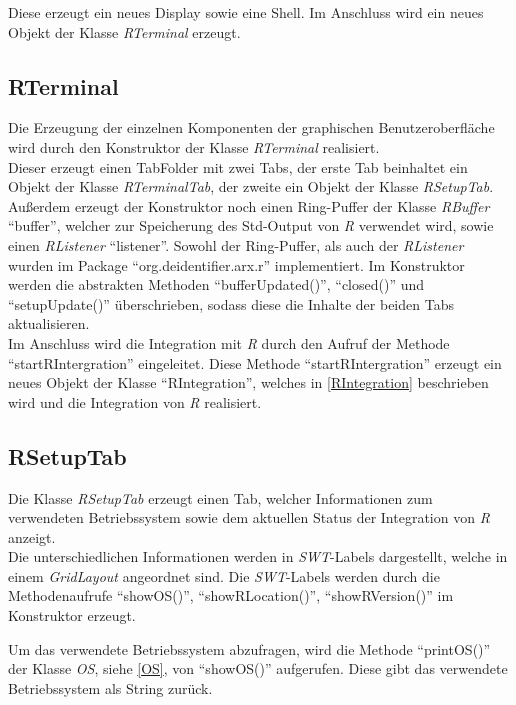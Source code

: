 \documentclass[a4paper, 12pt]{report} %
\begin{document}
Diese erzeugt ein neues Display sowie eine Shell. Im Anschluss wird ein neues Objekt der Klasse \textit{RTerminal} erzeugt.

\subsection{RTerminal}

Die Erzeugung der einzelnen Komponenten der graphischen Benutzeroberfläche wird durch den Konstruktor der Klasse \textit{RTerminal} realisiert.\\

Dieser erzeugt einen TabFolder mit zwei Tabs, der erste Tab beinhaltet ein Objekt der Klasse \textit{RTerminalTab}, der zweite ein Objekt der Klasse \textit{RSetupTab}.
Außerdem erzeugt der Konstruktor noch einen Ring-Puffer der Klasse \textit{RBuffer} "`buffer"', welcher zur Speicherung des Std-Output von \textit{R} verwendet wird, sowie einen \textit{RListener} "`listener"'. Sowohl der Ring-Puffer, als auch der \textit{RListener} wurden im Package "`org.deidentifier.arx.r"' implementiert.
Im Konstruktor werden die abstrakten Methoden "`bufferUpdated()"', "`closed()"' und "`setupUpdate()"' überschrieben, sodass diese die Inhalte der beiden Tabs aktualisieren.\\

Im Anschluss wird die Integration mit \textit{R} durch den Aufruf der Methode "`startRIntergration"' eingeleitet.
Diese Methode "`startRIntergration"' erzeugt ein neues Objekt der Klasse "`RIntegration"', welches in \ref{RIntegration} beschrieben wird und die Integration von \textit{R} realisiert.


\subsection{RSetupTab}

Die Klasse \textit{RSetupTab} erzeugt einen Tab, welcher Informationen zum verwendeten Betriebssystem sowie dem aktuellen Status der Integration von \textit{R} anzeigt.\\

Die unterschiedlichen Informationen werden in \textit{SWT}-Labels dargestellt, welche in einem \textit{GridLayout} angeordnet sind.
Die \textit{SWT}-Labels werden durch die Methodenaufrufe "`showOS()"', "`showRLocation()"', "`showRVersion()"' im Konstruktor erzeugt.

Um das verwendete Betriebssystem abzufragen, wird die Methode "`printOS()"' der Klasse \textit{OS}, siehe \ref{OS}, von "`showOS()"' aufgerufen. Diese gibt das verwendete Betriebssystem als String zurück.
\end{document}
